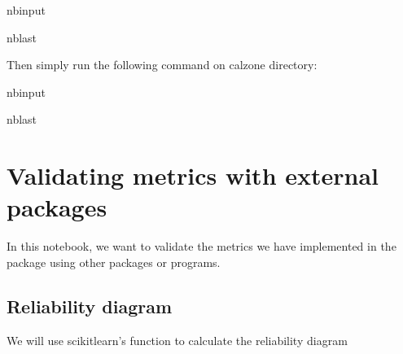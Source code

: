 \documentclass[letterpaper,10pt,english]{sphinxmanual}
\begin{document}
\begin{sphinxuseclass}{nbinput}
\begin{sphinxuseclass}{nblast}
{
\begin{sphinxVerbatim}[commandchars=\\\{\}]
\llap{\color{nbsphinxin}[ ]:\,\hspace{\fboxrule}\hspace{\fboxsep}}  
\end{sphinxVerbatim}
}

\end{sphinxuseclass}
\end{sphinxuseclass}
\sphinxAtStartPar
Then simply run the following command on calzone directory:

\begin{sphinxuseclass}{nbinput}
\begin{sphinxuseclass}{nblast}
{
\begin{sphinxVerbatim}[commandchars=\\\{\}]
\llap{\color{nbsphinxin}[ ]:\,\hspace{\fboxrule}\hspace{\fboxsep}} 
\end{sphinxVerbatim}
}

\end{sphinxuseclass}
\end{sphinxuseclass}
\sphinxstepscope


\chapter{Validating metrics with external packages}
\label{\detokenize{notebooks/validation:Validating-metrics-with-external-packages}}\label{\detokenize{notebooks/validation::doc}}
\sphinxAtStartPar
In this notebook, we want to validate the metrics we have implemented in the  package using other packages or programs.


\section{Reliability diagram}
\label{\detokenize{notebooks/validation:Reliability-diagram}}
\sphinxAtStartPar
We will use scikit\sphinxhyphen{}learn’s  function to calculate the reliability diagram
\end{document}
